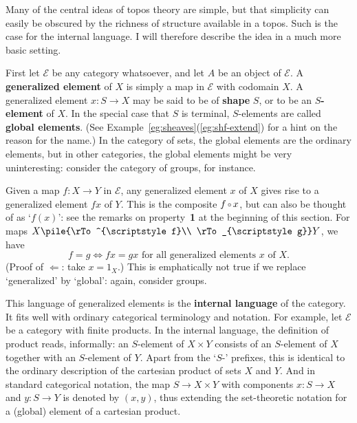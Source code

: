 \documentclass[12pt]{article}
\newcommand{\cat}[1]{\mathscr{#1}}
\newcommand{\parpair}[2]{\pile{\rTo^{\scriptstyle #1}\\ 
\rTo_{\scriptstyle #2}}}
\newcommand{\demph}[1]{\textbf{\textup{#1}}}
\newcommand{\of}{\,\raisebox{0.08ex}{\ensuremath{\scriptstyle\circ}}\,}
\newcommand{\E}{\cat{E}}
\newcommand{\cln}{\colon}
\begin{document}
Many of the central ideas of topos theory are simple, but that simplicity can
easily be obscured by the richness of structure available in a topos.
Such is the case for the internal language.  I will therefore describe the
idea in a much more basic setting.

First let $\E$ be any category whatsoever, and let $A$ be an object of $\E$.
A \demph{generalized element} of $X$ is simply a map in $\E$ with codomain
$X$.  A generalized element $x\cln S \to X$ may be said to be of \demph{shape}
$S$, or to be an \demph{$S$-element} of $X$.  In the special case that $S$ is
terminal, $S$-elements are called \demph{global elements}.  (See
Example~\ref{eg:sheaves}(\ref{eg:shf-extend}) for a hint on the reason for the
name.)  In the category of sets, the global elements are the ordinary
elements, but in other categories, the global elements might be very
uninteresting: consider the category of groups, for instance.

Given a map $f\cln X \to Y$ in $\E$, any generalized element $x$ of $X$ gives
rise to a generalized element $fx$ of $Y$.  This is the composite $f \of x$,
but can also be thought of as `$f(x)$': see the remarks on property~\textbf{1}
at the beginning of this section.  For maps $X \parpair{f}{g} Y$, we have
\[
f = g
\iff
fx = gx \text{ for all generalized elements } x \text{ of } X.
\]
(Proof of $\Leftarrow$: take $x = 1_X$.)  This is emphatically not true if we
replace `generalized' by `global': again, consider groups.  

This language of generalized elements is the \demph{internal language} of the
category.  It fits well with ordinary categorical terminology and notation.
For example, let $\E$ be a category with finite products.  In the internal
language, the definition of product reads, informally: an $S$-element of $X
\times Y$ consists of an $S$-element of $X$ together with an $S$-element of
$Y$.  Apart from the `$S$-' prefixes, this is identical to the ordinary
description of the cartesian product of sets $X$ and $Y$.  And in standard
categorical notation, the map $S \to X \times Y$ with components $x\cln S \to
X$ and $y\cln S \to Y$ is denoted by $(x, y)$, thus extending the set-theoretic
notation for a (global) element of a cartesian product.
\end{document}
